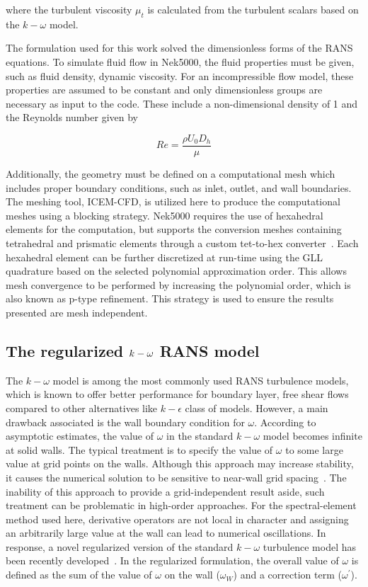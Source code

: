 where the turbulent viscosity $\mu_t$ is calculated from the turbulent scalars based on the $k-\omega$ model.
 
The formulation used for this work solved the dimensionless forms of the RANS equations.
To simulate fluid flow in Nek5000, the fluid properties must be given, such as fluid density, dynamic viscosity.
For an incompressible flow model, these properties are assumed to be constant and only dimensionless groups are necessary as input to the code.
These include a non-dimensional density of 1 and the Reynolds number given by

\begin{equation}
    Re = \frac{\rho U_0 D_h}{\mu}
\end{equation}

Additionally, the geometry must be defined on a computational mesh which includes proper boundary conditions, such as inlet, outlet, and wall boundaries.
The meshing tool, ICEM-CFD, is utilized here to produce the computational meshes using a blocking strategy.
Nek5000 requires the use of hexahedral elements for the computation, but supports the conversion meshes containing tetrahedral and prismatic elements through a custom tet-to-hex converter~\citep{Yuan2020}.
Each hexahedral element can be further discretized at run-time using the GLL quadrature based on the selected polynomial approximation order.
This allows mesh convergence to be performed by increasing the polynomial order, which is also known as p-type refinement.
This strategy is used to ensure the results presented are mesh independent.

\subsection{The regularized $\lowercase{k}-\omega$ RANS model}
\label{sec:nek2}

The $k-\omega$ model is among the most commonly used RANS turbulence models, which is known to offer better performance for boundary layer, free shear flows compared to other alternatives like $k-\epsilon$ class of models.
However, a main drawback associated is the wall boundary condition for $\omega$.
According to asymptotic estimates, the value of $\omega$ in the standard $k-\omega$ model becomes infinite at solid walls.
The typical treatment is to specify the value of $\omega$ to some large value at grid points on the walls.
Although this approach may increase stability, it causes the numerical solution to be sensitive to near-wall grid spacing~\citep{Wilcox1998}.
The inability of this approach to provide a grid-independent result aside, such treatment can be problematic in high-order approaches.
For the spectral-element method used here, derivative operators are not local in character and assigning an arbitrarily large value at the wall can lead to numerical oscillations.
In response, a novel regularized version of the standard $k-\omega$ turbulence model has been recently developed~\citep{Tomboulides2018}.
In the regularized formulation, the overall value of $\omega$ is defined as the sum of the value of $\omega$ on the wall ($\omega_W$) and a correction term ($\omega^\prime$).

